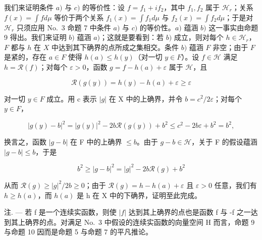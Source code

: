 我们来证明条件 \(a)\) 与 \(c)\) 的等价性：设 \(f = f_{1} + if_{2}\)，其中 \(f_{1}, f_{2}\) 属于 \(\mathcal{H}_{r}\)；关系 \(f(x) = \int f d\mu\) 等价于两个关系 \(f_{1}(x) = \int f_{1} d\mu\) 与 \(f_{2}(x) = \int f_{2} d\mu\)；于是对 \(\mathcal{H}_{r}\) 只须应用 No.~3 命题 7 中条件 \(a)\) 与 \(c)\) 的等价性。\(a)\) 蕴涵 \(b)\) 这一事实由命题 9 得出。我们来证明 \(b)\) 蕴涵 \(a)\)；这就是要看到：若 \(b)\) 成立，则对每个 \(h \in \mathcal{H}_{r}\)，\(F\) 都与 \(h\) 在 \(X\) 中达到其下确界的点所成之集相交。条件 \(b)\) 蕴涵 \(F\) 非空；由于 \(F\) 是紧的，存在 \(a \in F\) 使得 \(h(a) \leqslant h(y)\)（对一切 \(y \in F\)）。设 \(f \in \mathcal{H}\) 满足 \(h = \mathcal{R}(f)\)；对每个 \(\varepsilon > 0\)，函数 \(g = f - h(a) + \varepsilon\) 属于 \(\mathcal{H}\)，且

\[
\mathcal {R} (g (y)) = h (y) - h (a) + \varepsilon \geqslant \varepsilon
\]

对一切 \(y \in F\) 成立。用 c 表示 \(|g|\) 在 X 中的上确界，并令 \(b = c^{2}/2\varepsilon\)；对每个 \(y \in F\)，

\[
\left| g (y) - b \right| ^ {2} = \left| g (y) \right| ^ {2} - 2 b \mathcal {R} (g (y)) + b ^ {2} \leqslant c ^ {2} - 2 b \varepsilon + b ^ {2} = b ^ {2},
\]

换言之，函数 \(|g - b|\) 在 F 中的上确界 \(\leqslant b\)。由于 \(g - b \in \mathcal{H}\)，关于 F 的假设蕴涵 \(|g - b| \leqslant b\)，于是

\[
b ^ {2} \geqslant | g - b | ^ {2} = | g | ^ {2} - 2 b \mathcal {R} (g) + b ^ {2}
\]

从而 \(\mathcal{R}(g) \geqslant |g|^{2}/2b \geqslant 0\)；由于 \(\mathcal{R}(g) = h - h(a) + \varepsilon\) 且 \(\varepsilon > 0\) 任意，我们有 \(h \geqslant h(a)\)，而 \(h(a)\) 是 h 在 X 中的下确界，证明至此完成。

注. --- 若 f 是一个连续实函数，则使 \(|f|\) 达到其上确界的点也是函数 f 与 -f 之一达到其上确界的点。对满足 No.~3 中假设的连续实函数的向量空间 H 而言，命题 9 与命题 10 因而是命题 5 与命题 7 的平凡推论。

